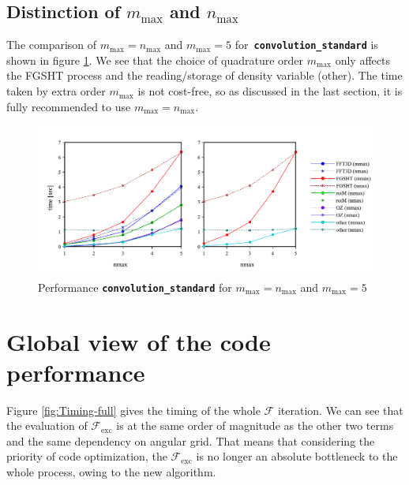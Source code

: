 \subsection{Distinction of $m_{\max}$ and $n_{\max}$}

The comparison of $m_{\max}=n_{\max}$ and $m_{\max}=5$ for\texttt{\textbf{
convolution\_standard}} is shown in figure \ref{fig:comparison-nmax}.
We see that the choice of quadrature order $m_{\max}$ only affects
the \acs{FGSHT} process and the reading/storage of density variable
(other). The time taken by extra order $m_{\max}$ is not cost-free,
so as discussed in the last section, it is fully recommended to use $m_{\max}=n_{\max}$.

\begin{figure}[H]
\begin{centering}
\includegraphics[bb=20bp 20bp 639bp 268bp,width=1\columnwidth]{_figure/results/nmax}
\par\end{centering}
\caption[Performance comparison of ``convolution\_standard'' for $m_{\max}=n_{\max}$
and $m_{\max}=5$]{Performance \texttt{\textbf{convolution\_standard}} for $m_{\max}=n_{\max}$
and $m_{\max}=5$\label{fig:comparison-nmax}}
\end{figure}


\section{Global view of the code performance}

Figure \ref{fig:Timing-full} gives the timing of the whole $\mathcal{F}$
iteration. We can see that the evaluation of $\mathcal{F}_{\mathrm{exc}}$
is at the same order of magnitude as the other two terms and the same
dependency on angular grid. That means that considering the priority
of code optimization, the $\mathcal{F}_{\mathrm{exc}}$ is no longer
an absolute bottleneck to the whole process, owing to the new algorithm.


